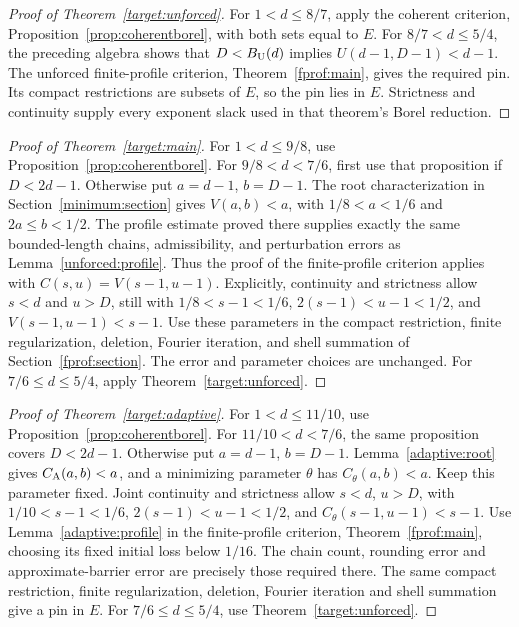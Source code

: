 \documentclass[11pt]{article}
\theoremstyle{definition}\newtheorem{remark}[theorem]{Remark}
\begin{document}
\begin{proof}[Proof of Theorem~\ref{target:unforced}]
For \(1<d\le8/7\), apply the coherent criterion,
Proposition~\ref{prop:coherentborel}, with both sets equal to \(E\).
For \(8/7<d\le5/4\), the preceding algebra shows that
\(D<B_{\rm U}(d)\) implies \(U(d-1,D-1)<d-1\).
The unforced finite-profile criterion, Theorem~\ref{fprof:main}, gives the
required pin. Its compact restrictions are subsets of \(E\), so the pin lies
in \(E\). Strictness and continuity supply every exponent slack used in
that theorem's Borel reduction.
\end{proof}

\begin{proof}[Proof of Theorem~\ref{target:main}]
For \(1<d\le9/8\), use Proposition~\ref{prop:coherentborel}.
For \(9/8<d<7/6\), first use that proposition if \(D<2d-1\).
Otherwise put \(a=d-1\), \(b=D-1\). The root characterization in
Section~\ref{minimum:section} gives \(V(a,b)<a\), with
\(1/8<a<1/6\) and \(2a\le b<1/2\).
The profile estimate proved there supplies exactly the same bounded-length
chains, admissibility, and perturbation errors as Lemma~\ref{unforced:profile}.
Thus the proof of the finite-profile criterion applies with
\(C(s,u)=V(s-1,u-1)\). Explicitly, continuity and strictness allow
\(s<d\) and \(u>D\), still with
\(1/8<s-1<1/6\), \(2(s-1)<u-1<1/2\), and
\(V(s-1,u-1)<s-1\). Use these parameters in the compact restriction,
finite regularization, deletion, Fourier iteration, and shell summation of
Section~\ref{fprof:section}. The error and parameter choices are unchanged.
For \(7/6\le d\le5/4\), apply Theorem~\ref{target:unforced}.
\end{proof}

\begin{proof}[Proof of Theorem~\ref{target:adaptive}]
For \(1<d\le11/10\), use Proposition~\ref{prop:coherentborel}.
For \(11/10<d<7/6\), the same proposition covers \(D<2d-1\).
Otherwise put \(a=d-1\), \(b=D-1\). Lemma~\ref{adaptive:root}
gives \(C_{\rm A}(a,b)<a\), and a minimizing parameter \(\theta\)
has \(C_\theta(a,b)<a\). Keep this parameter fixed. Joint continuity
and strictness allow \(s<d\), \(u>D\), with
\(1/10<s-1<1/6\), \(2(s-1)<u-1<1/2\), and
\(C_\theta(s-1,u-1)<s-1\).
Use Lemma~\ref{adaptive:profile} in the finite-profile criterion,
Theorem~\ref{fprof:main}, choosing its fixed initial loss below \(1/16\).
The chain count, rounding error and approximate-barrier error are precisely
those required there. The same compact restriction, finite regularization,
deletion, Fourier iteration and shell summation give a pin in \(E\).
For \(7/6\le d\le5/4\), use Theorem~\ref{target:unforced}.
\end{proof}
\end{document}
